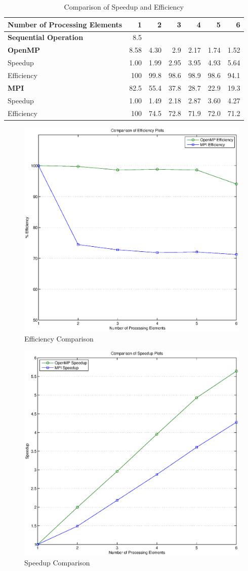 \documentclass{article}
\begin{document}
\begin{table}
\centering
\begin{tabular}[htbp]{| l | r | r | r | r | r | r |}
\hline
Number of Processing Elements  & 1 & 2 & 3 & 4 & 5 & 6 \\
\hline
\textbf{Sequential Operation} & 8.5 & & & & & \\
\hline
\textbf{OpenMP} & 8.58 & 4.30 & 2.9 & 2.17 & 1.74 & 1.52 \\
Speedup & 1.00 & 1.99 & 2.95 & 3.95 & 4.93 & 5.64 \\
Efficiency & 100 & 99.8 & 98.6 & 98.9 & 98.6 & 94.1 \\
\hline
\textbf{MPI}  & 82.5 & 55.4 & 37.8 & 28.7 & 22.9 & 19.3 \\
Speedup & 1.00 & 1.49 & 2.18 & 2.87 & 3.60 & 4.27 \\
Efficiency & 100 & 74.5 & 72.8 & 71.9 & 72.0 & 71.2 \\
\hline
\end{tabular}
\caption{Comparison of Speedup and Efficiency}
\label{tbl:spdeff}
\end{table}

\begin{figure}[htbp]
\centering
\includegraphics[width=0.6\linewidth]{efficiency.eps}
\caption{Efficiency Comparison}
\label{fig:eff}
\end{figure}

\begin{figure}[htbp]
\centering
\includegraphics[width=0.6\linewidth]{speedup.eps}
\caption{Speedup Comparison}
\label{fig:spd}
\end{figure}
\end{document}
